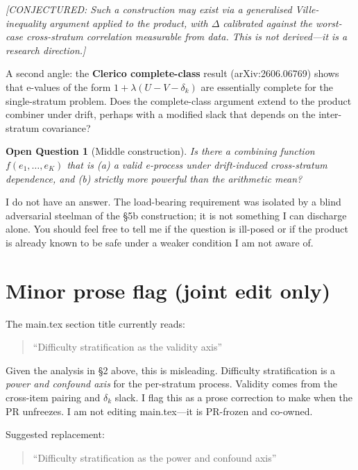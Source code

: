 \documentclass[11pt,a4paper]{article}
\newtheorem{question}[theorem]{Open Question}
\newcommand{\conjectured}[1]{\textit{[CONJECTURED: #1]}}
\begin{document}
\conjectured{Such a construction may exist via a generalised
Ville-inequality argument applied to the product, with $\Delta$
calibrated against the worst-case cross-stratum correlation measurable
from data.  This is not derived---it is a research direction.}

A second angle: the \textbf{Clerico complete-class} result
(arXiv:2606.06769) shows that e-values of the form
$1 + \lambda(U - V - \delta_k)$ are essentially complete for the
single-stratum problem.  Does the complete-class argument extend to
the product combiner under drift, perhaps with a modified slack that
depends on the inter-stratum covariance?

\begin{question}[Middle construction]
Is there a combining function $f(e_1, \ldots, e_K)$ that is
(a) a valid e-process under drift-induced cross-stratum dependence, and
(b) strictly more powerful than the arithmetic mean?
\end{question}

I do not have an answer.  The load-bearing requirement was isolated by
a blind adversarial steelman of the \S5b construction; it is not
something I can discharge alone.  You should feel free to tell me if
the question is ill-posed or if the product is already known to be
safe under a weaker condition I am not aware of.

\section{Minor prose flag (joint edit only)}

The main.tex section title currently reads:

\begin{quote}
``Difficulty stratification as the validity axis''
\end{quote}

Given the analysis in \S2 above, this is misleading.  Difficulty
stratification is a \emph{power and confound axis} for the per-stratum
process.  Validity comes from the cross-item pairing and $\delta_k$
slack.  I flag this as a prose correction to make when the PR unfreezes.
I am not editing main.tex---it is PR-frozen and co-owned.

Suggested replacement:
\begin{quote}
``Difficulty stratification as the power and confound axis''
\end{quote}
\end{document}
